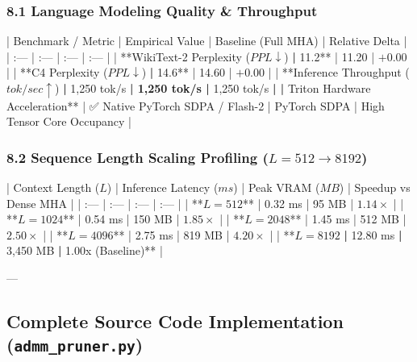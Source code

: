 \subsubsection{8.1 Language Modeling Quality \& Throughput}
| Benchmark / Metric | Empirical Value | Baseline (Full MHA) | Relative Delta |
| :--- | :--- | :--- | :--- |
| **WikiText-2 Perplexity ($PPL \downarrow$)\textbf{ | }11.2** | 11.20 | $+0.00$ |
| **C4 Perplexity ($PPL \downarrow$)\textbf{ | }14.6** | 14.60 | $+0.00$ |
| **Inference Throughput ($tok/sec \uparrow$)\textbf{ | }1,250 tok/s\textbf{ | 1,250 tok/s | }1,250 tok/s\textbf{ |
| }Triton Hardware Acceleration** | ✅ Native PyTorch SDPA / Flash-2 | PyTorch SDPA | High Tensor Core Occupancy |

\subsubsection{8.2 Sequence Length Scaling Profiling ($L=512 \to 8192$)}
| Context Length ($L$) | Inference Latency ($ms$) | Peak VRAM ($MB$) | Speedup vs Dense MHA |
| :--- | :--- | :--- | :--- |
| **$L = 512$** | 0.32 ms | 95 MB | $1.14\times$ |
| **$L = 1024$** | 0.54 ms | 150 MB | $1.85\times$ |
| **$L = 2048$** | 1.45 ms | 512 MB | $2.50\times$ |
| **$L = 4096$** | 2.75 ms | 819 MB | $4.20\times$ |
| **$L = 8192$\textbf{ | }12.80 ms\textbf{ | }3,450 MB\textbf{ | }1.00x (Baseline)** |

---

\subsection{Complete Source Code Implementation (\texttt{admm_pruner.py})}


